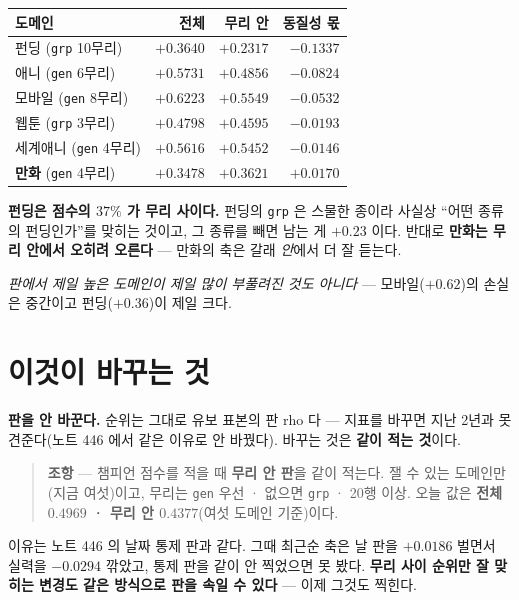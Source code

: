 \documentclass[11pt]{article}
\begin{document}
\begin{center}
\begin{tabular}{lrrr}
\hline
도메인 & 전체 & 무리 안 & 동질성 몫 \\
\hline
펀딩 (\texttt{grp} 10무리) & $+0.3640$ & $+0.2317$ & $\mathbf{-0.1337}$ \\
애니 (\texttt{gen} 6무리) & $+0.5731$ & $+0.4856$ & $-0.0824$ \\
모바일 (\texttt{gen} 8무리) & $+0.6223$ & $+0.5549$ & $-0.0532$ \\
웹툰 (\texttt{grp} 3무리) & $+0.4798$ & $+0.4595$ & $-0.0193$ \\
세계애니 (\texttt{gen} 4무리) & $+0.5616$ & $+0.5452$ & $-0.0146$ \\
\textbf{만화} (\texttt{gen} 4무리) & $+0.3478$ & $+0.3621$ & $\mathbf{+0.0170}$ \\
\hline
\end{tabular}
\end{center}

\textbf{펀딩은 점수의 $37\%$ 가 무리 사이다.} 펀딩의 \texttt{grp} 은
스물한 종이라 사실상 ``어떤 종류의 펀딩인가''를 맞히는 것이고, 그 종류를
빼면 남는 게 $+0.23$ 이다. 반대로 \textbf{만화는 무리 안에서 오히려
오른다} --- 만화의 축은 갈래 \emph{안}에서 더 잘 듣는다.

\emph{판에서 제일 높은 도메인이 제일 많이 부풀려진 것도 아니다} ---
모바일($+0.62$)의 손실은 중간이고 펀딩($+0.36$)이 제일 크다.

\section{이것이 바꾸는 것}

\textbf{판을 안 바꾼다.} 순위는 그대로 유보 표본의 판 rho 다 --- 지표를
바꾸면 지난 2년과 못 견준다(노트 446 에서 같은 이유로 안 바꿨다).
바꾸는 것은 \textbf{같이 적는 것}이다.

\begin{quote}
\textbf{조항} --- 챔피언 점수를 적을 때 \textbf{무리 안 판}을 같이
적는다. 잴 수 있는 도메인만(지금 여섯)이고, 무리는 \texttt{gen} 우선 ·
없으면 \texttt{grp} · 20행 이상. 오늘 값은 \textbf{전체 $0.4969$ · 무리
안 $0.4377$}(여섯 도메인 기준)이다.
\end{quote}

이유는 노트 446 의 날짜 통제 판과 같다. 그때 최근순 축은 날 판을
$+0.0186$ 벌면서 실력을 $-0.0294$ 깎았고, 통제 판을 같이 안 찍었으면
못 봤다. \textbf{무리 사이 순위만 잘 맞히는 변경도 같은 방식으로 판을
속일 수 있다} --- 이제 그것도 찍힌다.
\end{document}

